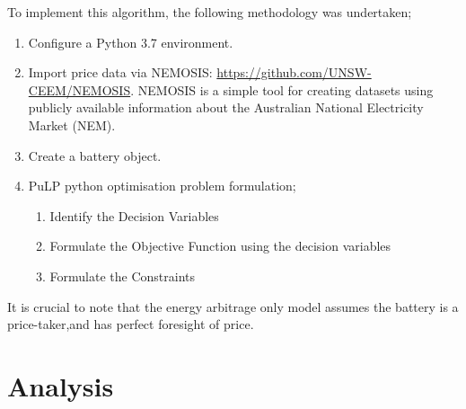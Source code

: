 To implement this algorithm, the following methodology was undertaken;
\begin{enumerate}
    \item Configure a Python 3.7 environment.
    \item Import price data via NEMOSIS:  \url{https://github.com/UNSW-CEEM/NEMOSIS}. NEMOSIS is a simple tool for creating datasets using publicly available information about the Australian National Electricity Market (NEM).
    \item Create a battery object.
    \item PuLP python optimisation problem formulation;
    \begin{enumerate}
        \item Identify the Decision Variables
        \item Formulate the Objective Function using the decision variables
        \item Formulate the Constraints
    \end{enumerate}
\end{enumerate}
It is crucial to note that the energy arbitrage only model assumes the battery is a price-taker,and has perfect foresight of price.
\section{ Analysis }
